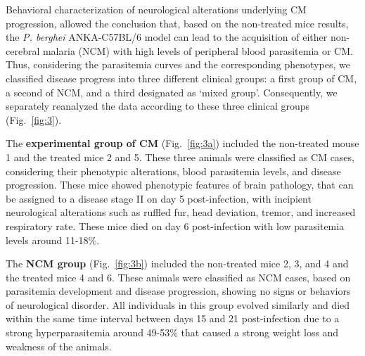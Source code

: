 \documentclass[empirical, authordate]{jote-new-article}
\begin{document}
Behavioral characterization of neurological alterations underlying CM progression, allowed the conclusion that, based on the non-treated mice results, the \emph{P. berghei} ANKA-C57BL/6 model can lead to the acquisition of either non-cerebral malaria (NCM) with high levels of peripheral blood parasitemia or CM. Thus, considering the parasitemia curves and the corresponding phenotypes, we classified disease progress into three different clinical groups: a first group of CM, a second of NCM, and a third designated as `mixed group'. Consequently, we separately reanalyzed the data according to these three clinical groups (Fig.~\ref{fig:3}).

The \textbf{experimental group of CM }(Fig.~\ref{fig:3a}) included the non-treated mouse 1 and the treated mice 2 and 5. These three animals were classified as CM cases, considering their phenotypic alterations, blood parasitemia levels, and disease progression. These mice showed phenotypic features of brain pathology, that can be assigned to a disease stage II on day 5 post-infection, with incipient neurological alterations such as ruffled fur, head deviation, tremor, and increased respiratory rate. These mice died on day 6 post-infection with low parasitemia levels around 11-18\%.


The \textbf{NCM group} (Fig.~\ref{fig:3b}) included the non-treated mice 2, 3, and 4 and the treated mice 4 and 6. These animals were classified as NCM cases, based on parasitemia development and disease progression, showing no signs or behaviors of neurological disorder. All individuals in this group evolved similarly and died within the same time interval between days 15 and 21 post-infection due to a strong hyperparasitemia around 49-53\% that caused a strong weight loss and weakness of the animals.
\end{document}
